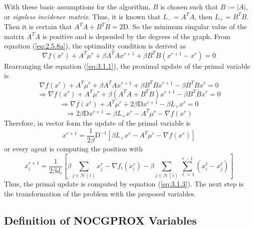     With these basic assumptions for the algorithm, $B$ is chosen such that $B := |A|$, or \textit{signless incidence matrix}. Thus, it is known that $L_- = A^TA$, then $L_+ = B^TB$. Then it is certain that $A^TA + B^TB = 2\mathrm{D}$. So the minimum singular value of the matrix $A^TA$ is positive and is depended by the degrees of the graph. From equation (\ref{eq:2.5.8a}), the optimality condition is derived as
    \begin{equation}\label{eq:3.1.1}
        \nabla f(x^r) + A^T\mu^r + \beta A^TAx^{r+1} + \beta B^TB (x^{r+1} - x^r) = 0
    \end{equation}
    Rearranging the equation (\ref{eq:3.1.1}), the proximal update of the primal variable is
    \begin{equation*}
        \nabla f(x^r) + A^T\mu^r + \beta A^TAx^{r+1} + \beta B^TBx^{r+1} - \beta B^TBx^r = 0
    \end{equation*}
    \begin{equation*}
        \Rightarrow  \nabla f(x^r) + A^T\mu^r + \beta \left( A^TA + B^TB\right)x^{r+1} - \beta B^TBx^r = 0   
    \end{equation*}
    \begin{equation*}
        \Rightarrow    \nabla f(x^r) + A^T\mu^r + 2\beta \mathrm{D}x^{r+1} - \beta L_+x^r = 0
    \end{equation*}    
    \begin{equation*}
        \Rightarrow 2\beta \mathrm{D}x^{r+1} = \beta L_+x^r -A^T\mu^r -\nabla f(x^r)
    \end{equation*}
    Therefore, in vector form the update of the primal variable is
    \begin{equation}\label{eq:3.1.2}
        x^{r+1} = \frac{1}{2\beta}\mathrm{D}^{-1} \left[ \beta L_+x^r -A^T\mu^r -\nabla f(x^r)\right]
    \end{equation}
    or every agent is computing the position with
    \begin{equation} \label{eq:3.1.3}
        x_i^{r+1} = \frac{1}{2\beta d_i} \left[\beta \sum_{j \in \mathcal{N}(i)} x_j^r - \nabla f_i(x_i^r) - \beta\sum_{j \in \mathcal{N}(i)} \sum_{\ell = 1}^{r - 1} \left( x_i^{\ell} - x_j^{\ell}\right)\right]
    \end{equation}
    Thus, the primal update is computed by equation (\ref{eq:3.1.3}). The next step is the transformation of the problem with the proposed variables. 

\subsection{Definition of NOCGPROX Variables}

